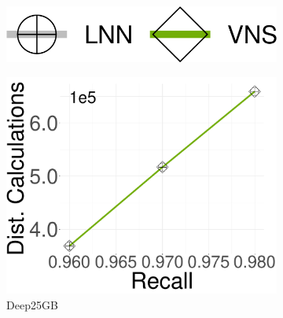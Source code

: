 \begin{figure}[ht]
	\captionsetup{justification=centering}
	\centering	
        \begin{subfigure}[b]{0.2\textwidth}
            \captionsetup{justification=centering}
	\centering	
        \includegraphics[width=\textwidth]{../img/oigas/CandNeighbors/search/legend.png}
    \end{subfigure}
    
    \centering
        \begin{subfigure}[b]{0.28\textwidth}
            \captionsetup{justification=centering}
	\centering	
        \includegraphics[width=\textwidth]{../img/oigas/CandNeighbors/search/25GB/deep_DC.pdf}
        \caption{Deep25GB}
        \label{fig:oigas:cnn:25:deep}
    \end{subfigure}
    \hspace{0.4cm}
            \begin{subfigure}[b]{0.28\textwidth}
                \captionsetup{justification=centering}
	\centering	

\end{subfigure}
\end{figure}
